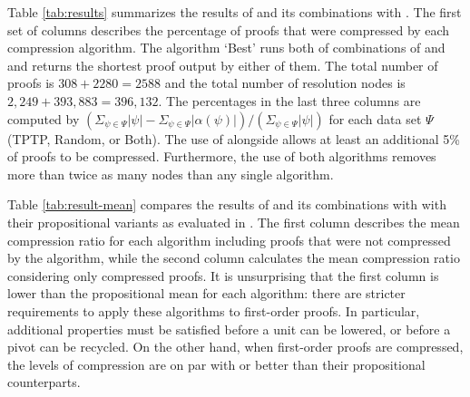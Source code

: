{Table \ref{tab:results} summarizes the results of {\FORPI} and its combinations with {\GFOLU}. The first set of columns describes the percentage of proofs that were compressed by each compression algorithm. The algorithm `Best' runs both of combinations of {\GFOLU} and {\FORPI} and returns the shortest proof output by either of them. The total number of proofs is $308+2280=2588$ and the total number of resolution nodes is $2,249 + 393,883
= 396,132$. The percentages in the last three columns are computed by $(\Sigma_{\psi \in \Psi} |\psi|  - \Sigma_{\psi\in \Psi} |\alpha(\psi)|)/(\Sigma_{\psi \in \Psi} |\psi|)$ for each data set $\Psi$ (TPTP, Random, or Both). The use of {\FORPI} alongside {\GFOLU} allows at least an additional 5\% of proofs to be compressed. Furthermore, the use of both algorithms removes more than twice as many nodes than any single algorithm.

Table \ref{tab:result-mean} compares the results of {\FORPI} and its combinations with {\GFOLU} with their propositional variants as evaluated in  \cite{Boudou}. The first column describes the mean compression ratio for each algorithm including proofs that were not compressed by the algorithm, while the second column calculates the mean compression ratio considering only compressed proofs. It is unsurprising that the first column is lower than the propositional mean for each algorithm: there are stricter requirements to apply these algorithms to first-order proofs. In particular, additional properties must be satisfied before a unit can be lowered, or before a pivot can be recycled. On the other hand, when first-order proofs are compressed, the levels of compression are on par with or better than their propositional counterparts.

\begin{figure}[p]
    

\end{figure}}
